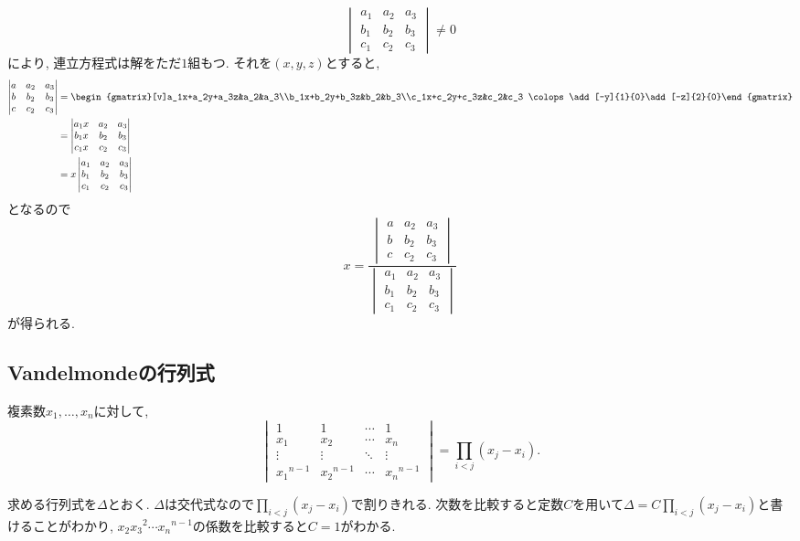 \begin{prf*}
\[\begin{vmatrix}a_1&a_2&a_3\\b_1&b_2&b_3\\c_1&c_2&c_3\end{vmatrix}\neq 0\]
により, 連立方程式は解をただ$1$組もつ.
それを$(x,y,z)$とすると,
\begin{align*}
\begin{vmatrix}a&a_2&a_3\\b&b_2&b_3\\c&c_2&c_3\end{vmatrix}
&=\begin{gmatrix}[v]a_1x+a_2y+a_3z&a_2&a_3\\b_1x+b_2y+b_3z&b_2&b_3\\c_1x+c_2y+c_3z&c_2&c_3
\colops\add[-y]{1}{0}\add[-z]{2}{0}\end{gmatrix}\\
&=\begin{vmatrix}a_1x&a_2&a_3\\b_1x&b_2&b_3\\c_1x&c_2&c_3\end{vmatrix}\\
&=x\begin{vmatrix}a_1&a_2&a_3\\b_1&b_2&b_3\\c_1&c_2&c_3\end{vmatrix}
\end{align*}
となるので
\[x=\frac{\begin{vmatrix}a&a_2&a_3\\b&b_2&b_3\\c&c_2&c_3\end{vmatrix}}{\begin{vmatrix}a_1&a_2&a_3\\b_1&b_2&b_3\\c_1&c_2&c_3\end{vmatrix}}\]
が得られる.
\end{prf*}
%
\subsection{Vandelmondeの行列式}
\begin{bthm}
複素数$x_1,\ldots,x_n$に対して,
\[\begin{vmatrix}1&1&\cdots&1\\x_1&x_2&\cdots&x_n\\\vdots&\vdots&\ddots&\vdots\\{x_1}^{n-1}&{x_2}^{n-1}&\cdots&{x_n}^{n-1}\end{vmatrix}=\prod_{i<j}(x_j-x_i).\]
\end{bthm}
\begin{prf*}
求める行列式を$\Delta$とおく.
$\Delta$は交代式なので$\prod_{i<j}(x_j-x_i)$で割りきれる.
次数を比較すると定数$C$を用いて$\Delta=C\prod_{i<j}(x_j-x_i)$と書けることがわかり, $x_2{x_3}^2\cdots{x_n}^{n-1}$の係数を比較すると$C=1$がわかる.
\end{prf*}
%
